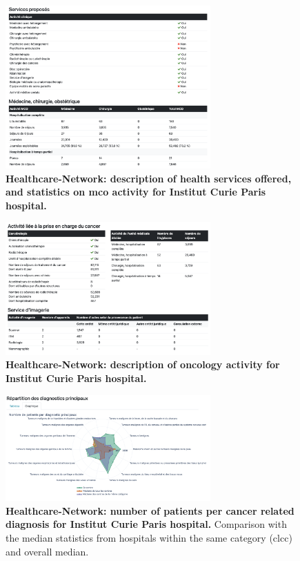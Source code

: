 \begin{figure}[H]
    \includegraphics[width=0.7\textwidth]{images/healthcare-network/curie-services.png}
    \centering
    \caption{
        \textbf{Healthcare-Network: description of health services offered, and statistics on \ac{mco} activity for Institut Curie Paris hospital.}
    }
    \label{fig:hn-curie-services}
\end{figure}


\begin{figure}[H]
    \includegraphics[width=0.7\textwidth]{images/healthcare-network/curie-cancero.png}
    \centering
    \caption{
        \textbf{Healthcare-Network: description of oncology activity for Institut Curie Paris hospital.}
    }
    \label{fig:hn-curie-cancero}
\end{figure}


\begin{figure}[H]
    \includegraphics[width=0.7\textwidth]{images/healthcare-network/curie-dp.png}
    \centering
    \caption{
        \textbf{Healthcare-Network: number of patients per cancer related diagnosis for Institut Curie Paris hospital.} Comparison with the median statistics from hospitals within the same category (\ac{clcc}) and overall median.
    }
    \label{fig:hn-curie-dp}
\end{figure}



